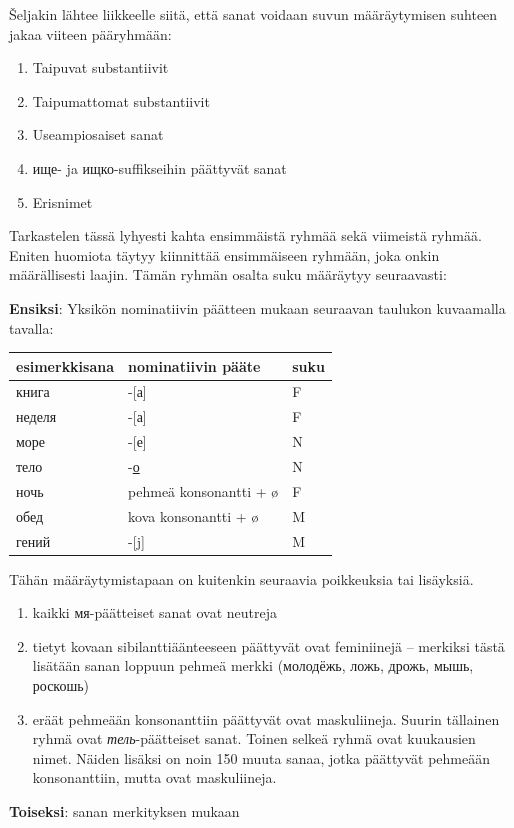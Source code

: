 \documentclass[]{scrartcl}
\providecommand{\tightlist}{%
  \setlength{\itemsep}{0pt}\setlength{\parskip}{0pt}}
\begin{document}
Šeljakin lähtee liikkeelle siitä, että sanat voidaan suvun määräytymisen
suhteen jakaa viiteen pääryhmään:

\begin{enumerate}
\def\labelenumi{\arabic{enumi}.}
\tightlist
\item
  Taipuvat substantiivit
\item
  Taipumattomat substantiivit
\item
  Useampiosaiset sanat
\item
  ище- ja ищко-suffikseihin päättyvät sanat
\item
  Erisnimet
\end{enumerate}

Tarkastelen tässä lyhyesti kahta ensimmäistä ryhmää sekä viimeistä
ryhmää. Eniten huomiota täytyy kiinnittää ensimmäiseen ryhmään, joka
onkin määrällisesti laajin. Tämän ryhmän osalta suku määräytyy
seuraavasti:

\textbf{Ensiksi}: Yksikön nominatiivin päätteen mukaan seuraavan
taulukon kuvaamalla tavalla:

\begin{longtable}[c]{@{}lll@{}}
\toprule
esimerkkisana & nominatiivin pääte & suku\tabularnewline
\midrule
\endhead
книга & -{[}а{]} & F\tabularnewline
неделя & -{[}а{]} & F\tabularnewline
море & -{[}е{]} & N\tabularnewline
тело & -\hyperref[ux43e]{о} & N\tabularnewline
ночь & pehmeä konsonantti + ø & F\tabularnewline
обед & kova konsonantti + ø & M\tabularnewline
гений & -{[}j{]} & M\tabularnewline
\bottomrule
\end{longtable}

Tähän määräytymistapaan on kuitenkin seuraavia poikkeuksia tai
lisäyksiä.

\begin{enumerate}
\def\labelenumi{\arabic{enumi}.}
\tightlist
\item
  kaikki мя-päätteiset sanat ovat neutreja
\item
  tietyt kovaan sibilanttiäänteeseen päättyvät ovat feminiinejä --
  merkiksi tästä lisätään sanan loppuun pehmeä merkki (молодёжь, ложь,
  дрожь, мышь, роскошь)
\item
  eräät pehmeään konsonanttiin päättyvät ovat maskuliineja. Suurin
  tällainen ryhmä ovat \emph{тель}-päätteiset sanat. Toinen selkeä ryhmä
  ovat kuukausien nimet. Näiden lisäksi on noin 150 muuta sanaa, jotka
  päättyvät pehmeään konsonanttiin, mutta ovat maskuliineja.
\end{enumerate}

\textbf{Toiseksi}: sanan merkityksen mukaan
\end{document}
